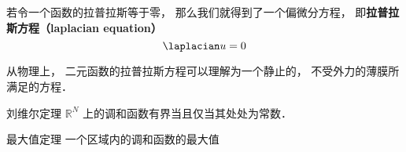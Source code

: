 

若令一个函数的拉普拉斯等于零， 那么我们就得到了一个偏微分方程， 即\textbf{拉普拉斯方程（laplacian equation）}
\begin{equation}
\laplacian u = 0
\end{equation}

从物理上， 二元函数的拉普拉斯方程可以理解为一个静止的， 不受外力的薄膜所满足的方程．

\begin{theorem}{刘维尔定理}
$\mathbb R^N$ 上的调和函数有界当且仅当其处处为常数．
\end{theorem}

\begin{theorem}{最大值定理}
一个区域内的调和函数的最大值
\end{theorem}
